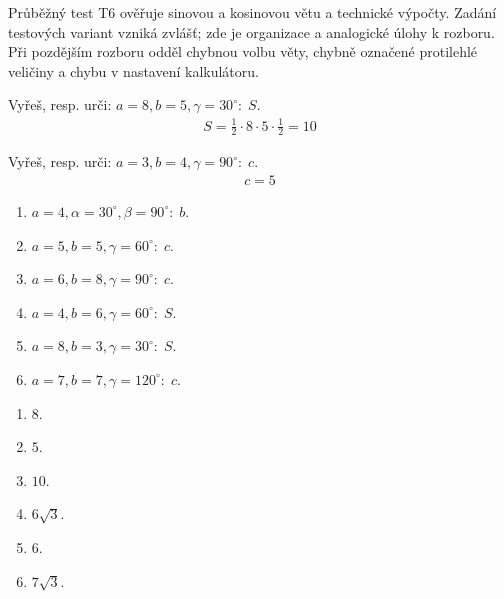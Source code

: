 \documentclass[11pt,a4paper]{article}
\begin{document}
Průběžný test T6 ověřuje sinovou a kosinovou větu a technické výpočty. Zadání testových variant vzniká zvlášť; zde je organizace a analogické úlohy k rozboru.
Při pozdějším rozboru odděl chybnou volbu věty, chybně označené protilehlé veličiny a chybu v nastavení kalkulátoru.
\begin{prikladReseniBox}[title={Příklad 1}]
Vyřeš, resp. urči: $a=8,b=5,\gamma=30^\circ:\;S$.
\tcblower
\[\begin{aligned}S=\frac{1}{2}\cdot8\cdot5\cdot\frac{1}{2}=10\end{aligned}\]
\end{prikladReseniBox}
\begin{prikladReseniBox}[title={Příklad 2}]
Vyřeš, resp. urči: $a=3,b=4,\gamma=90^\circ:\;c$.
\tcblower
\[\begin{aligned}c=5\end{aligned}\]
\end{prikladReseniBox}
\begin{zadaniReseniBox}[title={Samostatná práce 1}]
\begin{enumerate}[label=\alph*)]
\item $a=4,\alpha=30^\circ,\beta=90^\circ:\;b$.
\item $a=5,b=5,\gamma=60^\circ:\;c$.
\item $a=6,b=8,\gamma=90^\circ:\;c$.
\item $a=4,b=6,\gamma=60^\circ:\;S$.
\item $a=8,b=3,\gamma=30^\circ:\;S$.
\item $a=7,b=7,\gamma=120^\circ:\;c$.
\end{enumerate}
\tcblower
\begin{enumerate}[label=\alph*)]
\item $8$.
\item $5$.
\item $10$.
\item $6\sqrt3$.
\item $6$.
\item $7\sqrt3$.
\end{enumerate}
\end{zadaniReseniBox}
\end{document}
